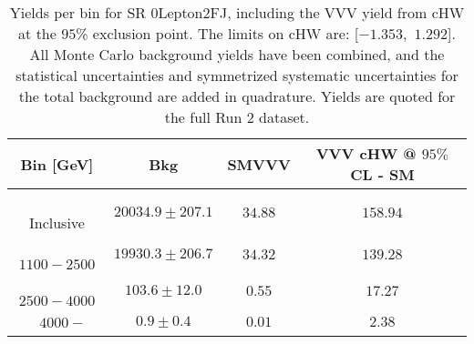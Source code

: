 \begin{table}[!htbp]
    \small
    \center
    \begin{tabular}{c||c|c|c}
    Bin [GeV] & Bkg & SMVVV & \pbox{20cm}{VVV \\ cHW @ $95\%$ CL - SM \\ }\\
    \hline
    \pbox{20cm}{ ~ \\Inclusive\\ } & $20034.9 \pm 207.1$ & $34.88$ & $158.94$\\
    \hline
    \pbox{20cm}{ ~ \\$1100-2500$\\ } & $19930.3 \pm 206.7$ & $34.32$ & $139.28$\\
    \hline
    \pbox{20cm}{ ~ \\$2500-4000$\\ } & $103.6 \pm 12.0$ & $0.55$ & $17.27$\\
    \hline
    \pbox{20cm}{ ~ \\$4000-$\\ } & $0.9 \pm 0.4$ & $0.01$ & $2.38$\\
\end{tabular}
    \caption{Yields per bin for SR 0Lepton2FJ, including the VVV yield from cHW at the $95$\% exclusion point. The limits on cHW are: [$-1.353$,~$1.292$]. All Monte Carlo background yields have been combined, and the statistical uncertainties and symmetrized systematic uncertainties for the total background are added in quadrature. Yields are quoted for the full Run 2 dataset.}
    \label{tab:0Lepton2FJ$binssignal}
\end{table}
